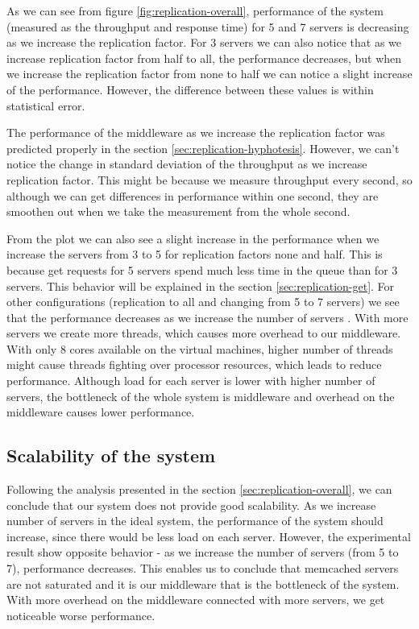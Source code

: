 \documentclass[11pt]{article}
\begin{document}

As we can see from figure \ref{fig:replication-overall}, performance of the system (measured as the throughput and response time) for 5 and 7 servers is decreasing as we increase the replication factor. For 3 servers we can also notice that as we increase replication factor from half to all, the performance decreases, but when we increase the replication factor from none to half we can notice a slight increase of the performance. However, the difference between these values is within statistical error.

The performance of the middleware as we increase the replication factor was predicted properly in the section \ref{sec:replication-hyphotesis}. However, we can't notice the change in standard deviation of the throughput as we increase replication factor. This might be because we measure throughput every second, so although we can get differences in performance within one second, they are smoothen out when we take the measurement from the whole second.

From the plot we can also see a slight increase in the performance when we increase the servers from 3 to 5 for replication factors none and half. This is because get requests for 5 servers spend much less time in the queue than for 3 servers. This behavior will be explained in the section \ref{sec:replication-get}. For other configurations (replication to all and changing from 5 to 7 servers) we see that the performance decreases as we increase the number of servers . With more servers we create more threads, which causes more overhead to our middleware. With only 8 cores available on the virtual machines, higher number of threads might cause threads fighting over processor resources, which leads to reduce performance. Although load for each server is lower with higher number of servers, the bottleneck of the whole system is middleware and overhead on the middleware causes lower performance.

\subsection{Scalability of the system}
Following the analysis presented in the section \ref{sec:replication-overall}, we can conclude that our system does not provide good scalability. As we increase number of servers in the ideal system, the performance of the system should increase, since there would be less load on each server. However, the experimental result show opposite behavior - as we increase the number of servers (from 5 to 7), performance decreases. This enables us to conclude that memcached servers are not saturated and it is our middleware that is the bottleneck of the system. With more overhead on the middleware connected with more servers, we get noticeable worse performance.
\end{document}
